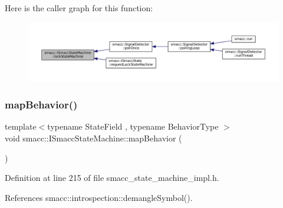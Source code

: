 Here is the caller graph for this function\+:
\nopagebreak
\begin{figure}[H]
\begin{center}
\leavevmode
\includegraphics[width=350pt]{classsmacc_1_1ISmaccStateMachine_a5c8d4c9a4b11c7950266a00e48080ce3_icgraph}
\end{center}
\end{figure}
\mbox{\label{classsmacc_1_1ISmaccStateMachine_acfb75233b79062cc7769ea751b7f320d}} 
\subsubsection{\texorpdfstring{map\+Behavior()}{mapBehavior()}}
{\footnotesize\ttfamily template$<$typename State\+Field , typename Behavior\+Type $>$ \\
void smacc\+::\+I\+Smacc\+State\+Machine\+::map\+Behavior (\begin{DoxyParamCaption}{ }\end{DoxyParamCaption})}



Definition at line 215 of file smacc\+\_\+state\+\_\+machine\+\_\+impl.\+h.



References smacc\+::introspection\+::demangle\+Symbol().


